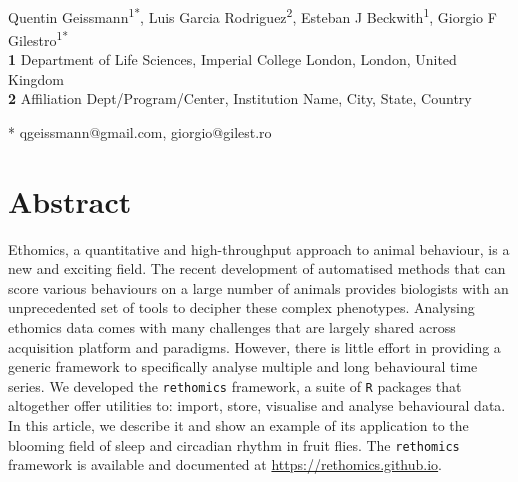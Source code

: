 \documentclass[10pt,letterpaper]{article}\usepackage[]{graphicx}\usepackage[]{color}
\date{}
\begin{document}
\vspace*{0.2in}

\begin{flushleft}
{\Large
\textbf{} 
}
\newline
\\
Quentin Geissmann\textsuperscript{1*},
Luis Garcia Rodriguez\textsuperscript{2},
Esteban J Beckwith\textsuperscript{1},
Giorgio F Gilestro\textsuperscript{1*}
\\
\bigskip
\textbf{1} Department of Life Sciences, Imperial College London, London, United Kingdom
\\
\textbf{2} Affiliation Dept/Program/Center, Institution Name, City, State, Country %
\\
\bigskip


* qgeissmann@gmail.com, giorgio@gilest.ro

\end{flushleft}
\section*{Abstract}
Ethomics, a quantitative and high-throughput approach to animal behaviour, is a new and exciting field.
The recent development of automatised methods that can score various behaviours on a large number of animals
provides biologists with an unprecedented set of tools to decipher these complex phenotypes. 
Analysing ethomics data comes with many challenges that are largely shared across acquisition platform and paradigms.
However, there is little effort in providing a generic framework to specifically analyse multiple and long behavioural time series.
We developed the \texttt{rethomics} framework, a suite of \texttt{R} packages that altogether offer utilities to:
import, store, visualise and analyse behavioural data.
In this article, we describe it and show an example of its application to the blooming field of sleep and circadian rhythm in fruit flies.
The \texttt{rethomics} framework is available and documented at \href{https://rethomics.github.io}{https://rethomics.github.io}.
\end{document}
